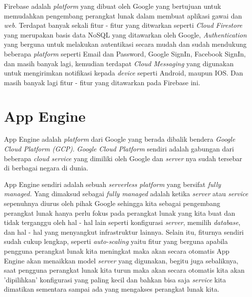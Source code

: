 Firebase adalah \textit{platform} yang dibuat oleh Google yang bertujuan untuk memudahkan pengembang perangkat lunak dalam membuat aplikasi gawai dan \textit{web}. Terdapat banyak sekali fitur - fitur yang ditwarkan seperti \textit{Cloud Firestore} yang merupakan basis data NoSQL yang ditawarkan oleh Google, \textit{Authentication} yang berguna untuk melakukan autentikasi secara mudah dan sudah mendukung beberapa \textit{platform} seperti Email dan Password, Google SignIn, Facebook SignIn, dan masih banyak lagi, kemudian terdapat \textit{Cloud Messaging} yang digunakan untuk mengirimkan notifikasi kepada \textit{device} seperti Android, maupun IOS. Dan masih banyak lagi fitur - fitur yang ditawarkan pada Firebase ini.

\section{App Engine}

App Engine adalah \textit{platform} dari Google yang berada dibalik bendera \textit{Google Cloud Platform (GCP)}. \textit{Google Cloud Platform} sendiri adalah gabungan dari beberapa \textit{cloud service} yang dimiliki oleh Google dan \textit{server} nya sudah tersebar di berbagai negara di dunia.

App Engine sendiri adalah sebuah \textit{serverless platform} yang bersifat \textit{fully managed.} Yang dimaksud sebagai \textit{fully managed} adalah ketika \textit{server} atau \textit{service} sepenuhnya diurus oleh pihak Google sehingga kita sebagai pengembang perangkat lunak hanya perlu fokus pada perangkat lunak yang kita buat dan tidak terganggu oleh hal - hal lain seperti konfigurasi \textit{server}, memilih \textit{database}, dan hal - hal yang menyangkut infrastruktur lainnya. Selain itu, fiturnya sendiri sudah cukup lengkap, seperti \textit{auto-scaling} yaitu fitur yang berguna apabila pengguna perangkat lunak kita meningkat maka akan secara otomatis App Engine akan menaikkan model \textit{server} yang digunakan, begitu juga sebaliknya, saat pengguna perangkat lunak kita turun maka akan secara otomatis kita akan 'dipilihkan' konfigurasi yang paling kecil dan bahkan bisa saja \textit{service} kita dimatikan sementara sampai ada yang mengakses perangkat lunak kita.